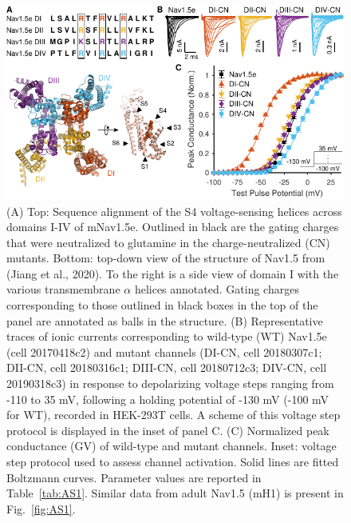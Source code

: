 \begin{figure}[t]
\centering
\includegraphics[width=115mm]{Figures/AppendixA/figure01.pdf}
\caption{
(A) Top: Sequence alignment of the S4 voltage-sensing helices across domains I-IV of mNav1.5e. Outlined in black are the gating charges that were neutralized to glutamine in the charge-neutralized (CN) mutants. Bottom: top-down view of the structure of Nav1.5 from (Jiang et al., 2020). To the right is a side view of domain I with the various transmembrane $\alpha$ helices annotated. Gating charges corresponding to those outlined in black boxes in the top of the panel are annotated as balls in the structure. 
(B) Representative traces of ionic currents corresponding to wild-type (WT) Nav1.5e (cell 20170418c2) and mutant channels (DI-CN, cell 20180307c1; DII-CN, cell 20180316c1; DIII-CN, cell 20180712c3; DIV-CN, cell 20190318c3) in response to depolarizing voltage steps ranging from -110 to 35 mV, following a holding potential of -130 mV (-100 mV for WT), recorded in HEK-293T cells. A scheme of this voltage step protocol is displayed in the inset of panel C. 
(C) Normalized peak conductance (GV) of wild-type and mutant channels. Inset: voltage step protocol used to assess channel activation. Solid lines are fitted Boltzmann curves. Parameter values are reported in Table~\ref{tab:AS1}. Similar data from adult Nav1.5 (mH1) is present in Fig.~\ref{fig:AS1}.}
\label{fig:A1}
\end{figure}

